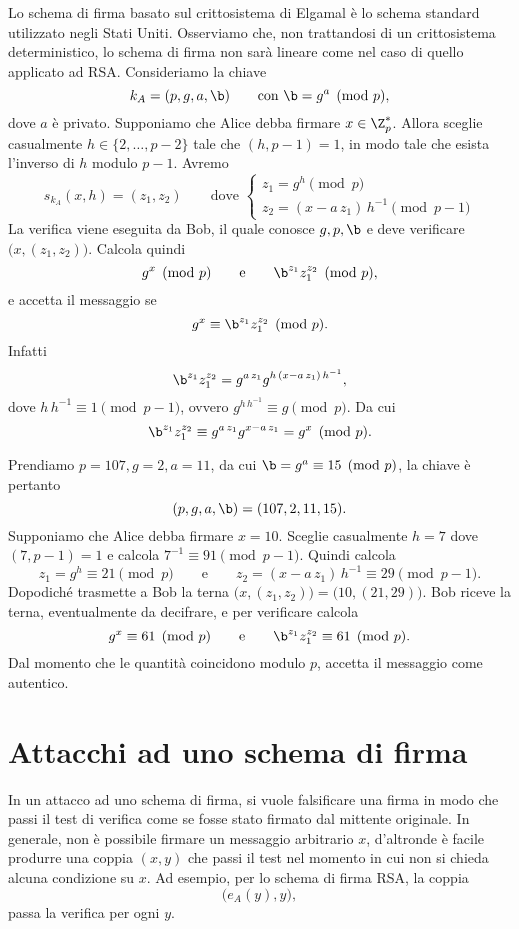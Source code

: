 	Lo schema di firma basato sul crittosistema di Elgamal è lo schema standard utilizzato negli Stati Uniti. Osserviamo che, non trattandosi di un crittosistema deterministico, lo schema di firma non sarà lineare come nel caso di quello applicato ad RSA.
	Consideriamo la chiave
		\[
		k_A = (p,g,a,\b) \qquad\text{con }\b=g^a \pmod{p},
		\]
	dove \(a\) è privato.
	Supponiamo che Alice debba firmare \(x\in \Z_p^*\). Allora sceglie casualmente \(h\in\{2,\ldots,p-2\}\) tale che \((h,p-1)=1\), in modo tale che esista l'inverso di \(h\) modulo \(p-1\). Avremo
		\[
		s_{k_A}(x,h) = (z_1,z_2) \qquad\text{dove } \begin{cases}
													z_1 = g^h \pmod{p}\\
													z_2 = (x-a\,z_1)\,h^{-1} \pmod{p-1}
													\end{cases}
		\]
	La verifica viene eseguita da Bob, il quale conosce \(g,p,\b\) e deve verificare \(\big(x,(z_1,z_2)\big)\). Calcola quindi
		\[
		g^x \pmod{p} \qquad\text{e}\qquad \b^{z_1} z_1^{z_2} \pmod{p},
		\]
	e accetta il messaggio se
		\[
		g^x \equiv \b^{z_1} z_1^{z_2} \pmod{p}.
		\]
	Infatti
		\[
		\b^{z_1} z_1^{z_2} = g^{a\,z_1} g^{h\,(x-a\,z_1)\,h^{-1}},
		\]
	dove \(h\,h^{-1} \equiv 1 \pmod{p-1}\), ovvero \(g^{h\,h^{-1}} \equiv g \pmod{p}\). Da cui
		\[
		\b^{z_1} z_1^{z_2} \equiv g^{a\,z_1} g^{x-a\,z_1} = g^x \pmod{p}.
		\]

	\begin{ese}
	Prendiamo \(p=107,g=2,a=11\), da cui \(\b=g^a \equiv 15 \pmod{p}\), la chiave è pertanto
		\[
		(p,g,a,\b) = (107,2,11,15).
		\]
	Supponiamo che Alice debba firmare \(x=10\). Sceglie casualmente \(h=7\) dove \((7,p-1)=1\) e calcola \(7^{-1} \equiv 91 \pmod{p-1}\). Quindi calcola
		\[
		z_1 = g^h \equiv 21 \pmod{p} \qquad\text{e}\qquad z_2 = (x-a\,z_1)\,h^{-1} \equiv 29 \pmod{p-1}.
		\]
	Dopodiché trasmette a Bob la terna \(\big(x,(z_1,z_2)\big)=\big(10,(21,29)\big)\). Bob riceve la terna, eventualmente da decifrare, e per verificare calcola
		\[
		g^x \equiv 61 \pmod{p} \qquad\text{e}\qquad \b^{z_1}z_1^{z_2} \equiv 61 \pmod{p}.
		\]
	Dal momento che le quantità coincidono modulo \(p\), accetta il messaggio come autentico.
	\end{ese}

\section{Attacchi ad uno schema di firma}

	In un attacco ad uno schema di firma, si vuole falsificare una firma in modo che passi il test di verifica come se fosse stato firmato dal mittente originale.
	In generale, non è possibile firmare un messaggio arbitrario \(x\), d'altronde è facile produrre una coppia \((x,y)\) che passi il test nel momento in cui non si chieda alcuna condizione su \(x\).
	Ad esempio, per lo schema di firma RSA, la coppia
		\[
		\big(e_A(y),y\big),
		\]
	passa la verifica per ogni \(y\).


